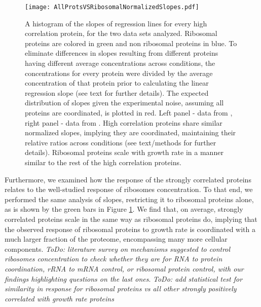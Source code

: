 \documentclass[notitlepage]{article}
\begin{document}
\begin{figure}[h]
\centering
\texttt{[image: AllProtsVSRibosomalNormalizedSlopes.pdf]}
\caption{
    A histogram of the slopes of regression lines for every high correlation protein, for the two data sets analyzed.
    Ribosomal proteins are colored in green and non ribosomal proteins in blue.
    To eliminate differences in slopes resulting from different proteins having different average concentrations across conditions, the concentrations for every protein were divided by the average concentration of that protein prior to calculating the linear regression slope (see text for further details).
    The expected distribution of slopes given the experimental noise, assuming all proteins are coordinated, is plotted in red.
    Left panel - data from \cite{Valgepea2013}, right panel - data from \cite{Heinemann2014}.
    High correlation proteins share similar normalized slopes, implying they are coordinated, maintaining their relative ratios across conditions (see text/methods for further details).
    Ribosomal proteins scale with growth rate in a manner similar to the rest of the high correlation proteins.
}
\label{fig:globalfit}
\end{figure}

Furthermore, we examined how the response of the strongly correlated proteins relates to the well-studied response of ribosomes concentration.
To that end, we performed the same analysis of slopes, restricting it to ribosomal proteins alone, as is shown by the green bars in Figure \ref{fig:globalfit}.
We find that, on average, strongly correlated proteins scale in the same way as ribosomal proteins do, implying that the observed response of ribosomal proteins to growth rate is coordinated with a much larger fraction of the proteome, encompassing many more cellular components.
\emph{ToDo: literature survey on mechanisms suggested to control ribosomes concentration to check whether they are for RNA to protein coordination, rRNA to mRNA control, or ribosomal protein control, with our findings highlighting questions on the last ones}.
\emph{ToDo: add statistical test for similarity in response for ribosomal proteins vs all other strongly positively correlated with growth rate proteins}
\end{document}
